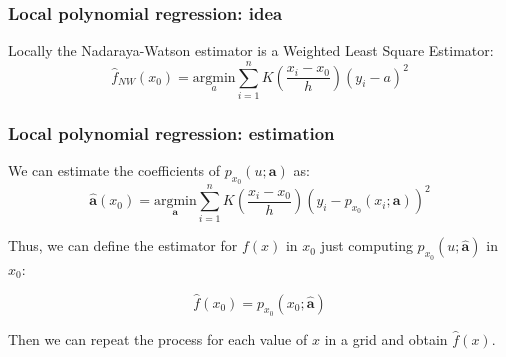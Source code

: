 \documentclass[pdf]{beamer}\usepackage[]{graphicx}\usepackage[]{color}
\begin{document}
\begin{frame}
\frametitle{Local polynomial regression: idea}

Locally the Nadaraya-Watson estimator is a Weighted Least Square Estimator:
$$
\hat{f}_{NW}(x_0) = \underset{a}{\mbox{argmin}} \sum_{i=1}^n K\left(\frac{x_i-x_0}{h}\right)(y_i - a)^2
$$

\hfill


\end{frame}

\begin{frame}
\frametitle{Local polynomial regression: estimation}

We can estimate the coefficients of $p_{x_0}(u;\boldsymbol{a})$ as:
$$
\hat{\boldsymbol{a}}(x_0) = \underset{\boldsymbol{a}}{\mbox{argmin}}
\sum_{i=1}^n K\left(\frac{x_i-x_0}{h}\right)\left(y_i - p_{x_0}(x_i;{\boldsymbol{a}})\right)^2
$$

Thus, we can define the estimator for $f(x)$ in $x_0$ just computing $p_{x_0}(u;\hat{\boldsymbol{a}})$ in $x_0$:

$$
\hat{f}(x_0) = p_{x_0}(x_0; \hat{\boldsymbol{a}})
$$

Then we can repeat the process for each value of $x$ in a grid and obtain $\hat{f}(x)$.

\end{frame}
\end{document}

